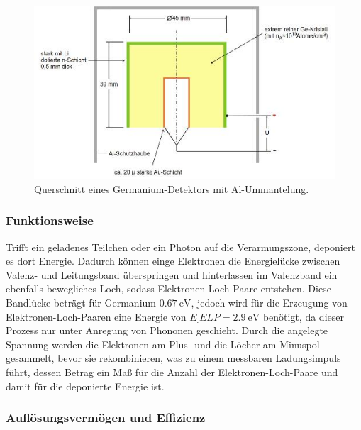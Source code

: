 \begin{figure}
	\centering
	\includegraphics[width=\linewidth-70pt,height=\textheight-70pt,keepaspectratio]{content/images/Detektor.jpg}
	\caption{Querschnitt eines Germanium-Detektors mit Al-Ummantelung\cite{V18}.}
	\label{fig:Det}
\end{figure}

\subsubsection{Funktionsweise}

Trifft ein geladenes Teilchen oder ein Photon auf die Verarmungszone, deponiert es dort Energie. Dadurch können einge Elektronen die Energielücke zwischen Valenz- und Leitungsband überspringen und hinterlassen im Valenzband ein ebenfalls bewegliches Loch, sodass Elektronen-Loch-Paare entstehen. Diese Bandlücke beträgt für Germanium $\SI{0,67}{\electronvolt}$, jedoch wird für die Erzeugung von Elektronen-Loch-Paaren eine Energie von $E_.{ELP}=\SI{2,9}{\electronvolt}$\cite{V18} benötigt, da dieser Prozess nur unter Anregung von Phononen geschieht. Durch die angelegte Spannung werden die Elektronen am Plus- und die Löcher am Minuspol gesammelt, bevor sie rekombinieren, was zu einem messbaren Ladungsimpuls führt, dessen Betrag ein Maß für die Anzahl der Elektronen-Loch-Paare und damit für die deponierte Energie ist.

\subsubsection{Auflösungsvermögen und Effizienz}
\label{subsubsec:Effizienz}

